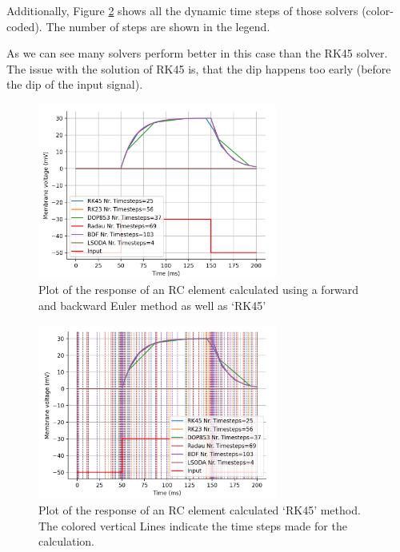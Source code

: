 \documentclass{article}
\begin{document}
    Additionally, Figure \ref{fig:RC_all_solvers_with_timesteps} shows all the dynamic time steps of those solvers (color-coded).
    The number of steps are shown in the legend.

    \vspace{10pt}
    As we can see many solvers perform better in this case than the RK45 solver. The issue with the solution of RK45 is, that the dip happens too early (before the dip of the input signal).


    \begin{figure}[h!]
        \centering
        \includegraphics[width=0.7\textwidth]{RC_all_solvers.png}
        \caption{Plot of the response of an RC element calculated using a forward and backward Euler method as well as ‘RK45’}
        \label{fig:RC_all_solvers}
    \end{figure}
    \begin{figure}[h!]
        \centering
        \includegraphics[width=0.7\textwidth]{RC_all_solvers_with_timesteps.png}
        \caption{Plot of the response of an RC element calculated ‘RK45’ method. The colored vertical Lines indicate the time steps made for the calculation.}
        \label{fig:RC_all_solvers_with_timesteps}
    \end{figure}
\end{document}
